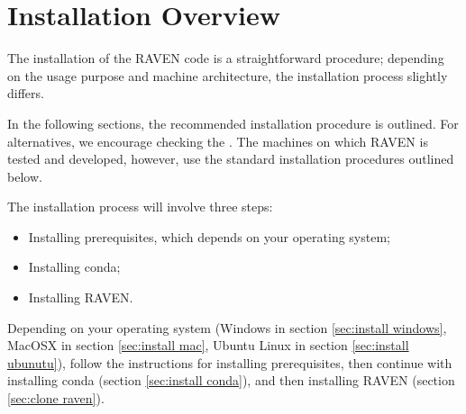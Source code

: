 \section{Installation Overview}
\label{sec:install overview}

The installation of the RAVEN code is a straightforward procedure;
depending on the usage purpose and machine architecture, the
installation process slightly differs.

In the following sections, the recommended installation procedure is outlined.  For alternatives, we encourage
checking the \wiki.  The machines on which
RAVEN is tested and developed, however, use the standard installation procedures outlined below.

The installation process will involve three steps:
\begin{itemize}
  \item Installing prerequisites, which depends on your operating system;
  \item Installing conda;
  \item Installing RAVEN.
\end{itemize}

Depending on your operating system (Windows in section \ref{sec:install windows}, MacOSX in section
\ref{sec:install mac}, Ubuntu Linux in section \ref{sec:install ubunutu}), follow the instructions for installing prerequisites, then continue with
installing conda (section \ref{sec:install conda}), and then installing RAVEN (section \ref{sec:clone raven}).
